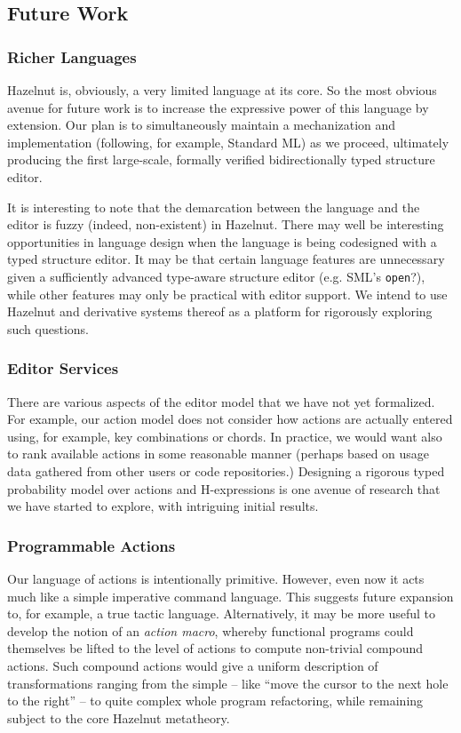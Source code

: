 \documentclass[9pt]{sigplanconf}
\begin{document}
\subsection{Future Work}
\subsubsection{Richer Languages}
Hazelnut is, obviously, a very limited language at its core. So the most
obvious avenue for future work is to increase the expressive power of this
language by extension. Our plan is to simultaneously maintain a
mechanization and implementation (following, for example, Standard ML) as
we proceed, ultimately producing the first large-scale, formally verified
bidirectionally typed structure editor.

It is interesting to note that the demarcation between the language and the
editor is fuzzy (indeed, non-existent) in Hazelnut. There may well be
interesting opportunities in language design when the language is being
codesigned with a typed structure editor. It may be that certain language
features are unnecessary given a sufficiently advanced type-aware structure
editor (e.g. SML's \texttt{open}?), while other features may only be
practical with editor support. We intend to use Hazelnut and derivative
systems thereof as a platform for rigorously exploring such questions.

\subsubsection{Editor Services}
There are various aspects of the editor model that we have not yet
formalized. For example, our action model does not consider how actions are
actually entered using, for example, key combinations or chords. In
practice, we would want also to rank available actions in some reasonable
manner (perhaps based on usage data gathered from other users or code
repositories.) Designing a rigorous typed probability model over actions
and H-expressions is one avenue of research that we have started to
explore, with intriguing initial results.

\subsubsection{Programmable Actions}
Our language of actions is intentionally primitive. However, even now it
acts much like a simple imperative command language. This suggests future
expansion to, for example, a true tactic language. Alternatively, it may be
more useful to develop the notion of an \emph{action macro}, whereby
functional programs could themselves be lifted to the level of actions to
compute non-trivial compound actions. Such compound actions would give a
uniform description of transformations ranging from the simple -- like
``move the cursor to the next hole to the right'' -- to quite complex whole
program refactoring, while remaining subject to the core Hazelnut
metatheory.
\end{document}

